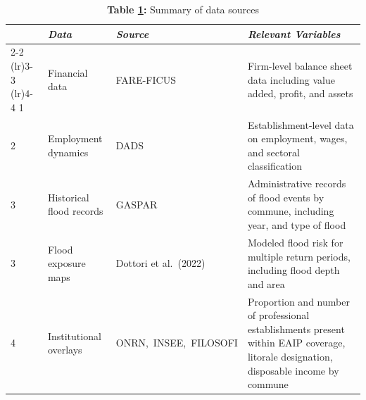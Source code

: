 \begin{table}[ht]
\centering
\renewcommand{\arraystretch}{1.15}
\small
\caption{\textbf{Table \ref{tab:data_sources}:} Summary of data sources}
\label{tab:data_sources}
\begin{tabular}{@{}p{0.3cm}p{4cm}p{4cm}>{\raggedright\arraybackslash}p{6.5cm}@{}}
\toprule
\textit{} & \textit{Data} & \textit{Source} & \textit{Relevant Variables} \\
\cmidrule[0.3pt](lr){2-2} \cmidrule[0.3pt](lr){3-3} \cmidrule[0.3pt](lr){4-4}
1 & Financial data & FARE-FICUS & Firm-level balance sheet data including value added, profit, and assets \\
2 & Employment dynamics & DADS & Establishment-level data on employment, wages, and sectoral classification \\
3 & Historical flood records & GASPAR & Administrative records of flood events by commune, including year, and type of flood \\

3 & Flood exposure maps & Dottori et al.\ (2022) & Modeled flood risk for multiple return periods, including flood depth and area \\

4 & Institutional overlays & \mbox{ONRN, INSEE, FILOSOFI} & Proportion and number of professional establishments present within EAIP coverage, litorale designation, disposable income by commune\\ 

\bottomrule
\end{tabular}
\end{table}
